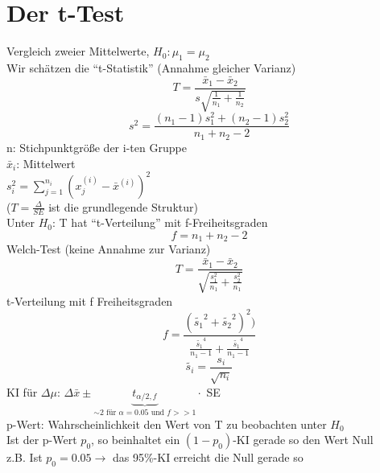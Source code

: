 \section{Der t-Test}
Vergleich zweier Mittelwerte, $H_0: \mu_1 = \mu_2$ \\
Wir schätzen die ``t-Statistik'' (Annahme gleicher Varianz) \\
\[ T = \frac{\bar{x}_1 - \bar{x}_2}{s \sqrt{\frac{1}{n_1} + \frac{1}{n_2}}} \]
\[ s^2 = \frac{(n_1 - 1) s_1^2 + (n_2 -1) s_2^2}{n_1 + n_2 -2} \]
n: Stichpunktgröße der i-ten Gruppe \\
$\bar{x}_i$: Mittelwert \\
$s_i^2 = \sum\limits_{j=1}^{n_i} (x_j^{(i)} - \bar{x}^{(i)} )^2 $ \\
($T = \frac{\Delta}{SE}$ ist die grundlegende Struktur) \\
Unter $H_0$: T hat ``t-Verteilung'' mit f-Freiheitsgraden
\[ f= n_1 + n_2 -2 \]
Welch-Test (keine Annahme zur Varianz) \\
\[ T = \frac{\bar{x}_1 - \bar{x}_2 }{\sqrt{\frac{s_1^2}{n_1} + \frac{s_2^2}{n_1}}} \]
t-Verteilung mit f Freiheitsgraden
\[ f=\frac{(\tilde{s_1}^2 + \tilde{s_2}^2)^2)}{\frac{\tilde{s_1}^4}{n_1 - 1} + \frac{\tilde{s_1}^4}{n_1 - 1}} \]
\[ \tilde{s_i} = \frac{s_i}{\sqrt{n_i}} \]
KI für $\Delta \mu$: $\Delta \bar{x} \pm \underbrace{t_{\alpha / 2 , f}}_{\sim 2 \text{ für } \alpha=0.05 \text{ und } f >> 1}  \cdot$ SE \\
p-Wert: Wahrscheinlichkeit den Wert von T zu beobachten unter $H_0$ \\
Ist der p-Wert $p_0$, so beinhaltet ein $(1-p_0)$-KI gerade so den Wert Null \\
z.B. Ist $p_0=0.05 \rightarrow$ das 95\%-KI erreicht die Null gerade so

